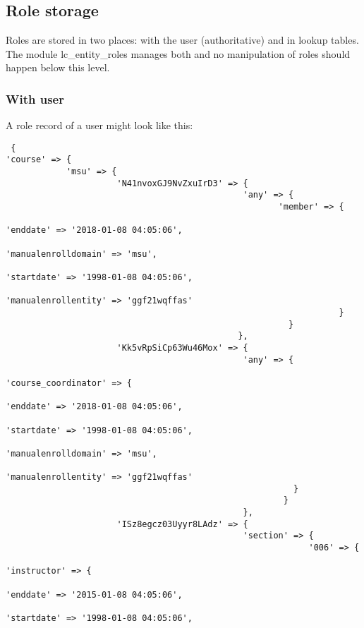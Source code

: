 \subsection{Role storage}
Roles are stored in two places: with the user (authoritative) and in lookup tables. The module lc\_entity\_roles manages both and no manipulation of roles should happen below this level.
\subsubsection{With user}\label{rolerecord}
A role record of a user might look like this:
\begin{verbatim}
 {
'course' => {
            'msu' => {
                      'N41nvoxGJ9NvZxuIrD3' => {
                                               'any' => {
                                                      'member' => {
                                                                 'enddate' => '2018-01-08 04:05:06',
                                                                 'manualenrolldomain' => 'msu',
                                                                 'startdate' => '1998-01-08 04:05:06',
                                                                 'manualenrollentity' => 'ggf21wqffas'
                                                                  }
                                                        }
                                              },
                      'Kk5vRpSiCp63Wu46Mox' => {
                                               'any' => {
                                                       'course_coordinator' => {
                                                                  'enddate' => '2018-01-08 04:05:06',
                                                                  'startdate' => '1998-01-08 04:05:06',
                                                                  'manualenrolldomain' => 'msu',
                                                                  'manualenrollentity' => 'ggf21wqffas'
                                                         }
                                                       }
                                               },
                      'ISz8egcz03Uyyr8LAdz' => {
                                               'section' => {
                                                            '006' => {
                                                               'instructor' => {
                                                                  'enddate' => '2015-01-08 04:05:06',
                                                                  'startdate' => '1998-01-08 04:05:06',

\end{verbatim}

